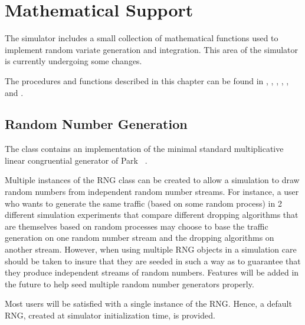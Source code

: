 %
%
\chapter{Mathematical Support}
\label{sec:math}

The simulator includes a small collection of mathematical
functions used to implement random variate generation and integration.
This area of the simulator is currently undergoing some
changes.

The procedures and functions described in this chapter can be found in
,
,
,
,
, and
.

\section{Random Number Generation}
\label{sec:random}

The  class contains an implementation of the minimal standard
multiplicative linear congruential generator of
Park \etal~\cite{Park88:Random}.

Multiple instances of the RNG class can be created to allow a
simulation to draw random numbers from independent random number
streams.  For instance, a user who wants to generate the same traffic
(based on some random process) in 2 different simulation experiments
that compare different dropping algorithms that are themselves based
on random processes may choose to base the traffic generation on one
random number stream and the dropping algorithms on another stream.
However, when using multiple RNG objects in a simulation care should
be taken to insure that they are seeded in such a way as to guarantee
that they produce independent streams of random numbers.  Features
will be added in the future to help seed multiple random number
generators properly.

Most users will be satisfied with a single instance of the RNG.
Hence, a default RNG, created at simulator initialization time, is
provided.

